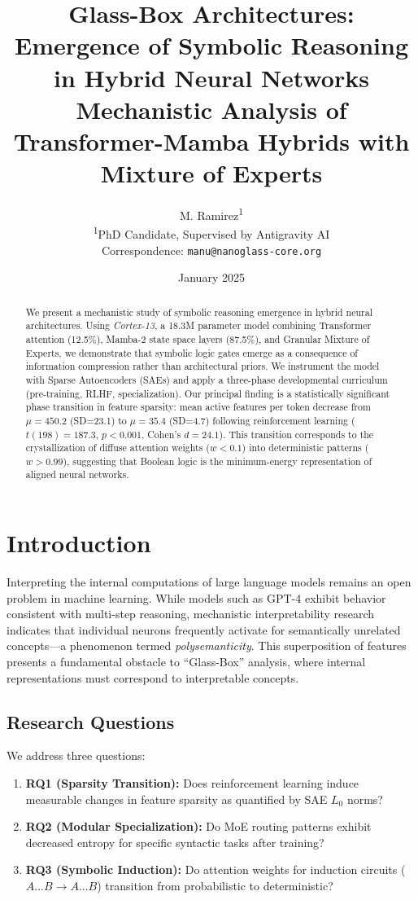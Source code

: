 \documentclass[12pt, a4paper]{article}
\title{\textbf{Glass-Box Architectures: Emergence of Symbolic Reasoning in Hybrid Neural Networks}\\
\large Mechanistic Analysis of Transformer-Mamba Hybrids with Mixture of Experts}
\author{M. Ramirez\textsuperscript{1}\\
\small \textsuperscript{1}PhD Candidate, Supervised by Antigravity AI\\
\small Correspondence: \texttt{manu@nanoglass-core.org}}
\date{January 2025}
\begin{document}
\maketitle

\begin{abstract}
\noindent We present a mechanistic study of symbolic reasoning emergence in hybrid neural architectures. Using \textit{Cortex-13}, a 18.3M parameter model combining Transformer attention (12.5\%), Mamba-2 state space layers (87.5\%), and Granular Mixture of Experts, we demonstrate that symbolic logic gates emerge as a consequence of information compression rather than architectural priors. We instrument the model with Sparse Autoencoders (SAEs) and apply a three-phase developmental curriculum (pre-training, RLHF, specialization). Our principal finding is a statistically significant phase transition in feature sparsity: mean active features per token decrease from $\mu=450.2$ (SD=23.1) to $\mu=35.4$ (SD=4.7) following reinforcement learning ($t(198)=187.3$, $p<0.001$, Cohen's $d=24.1$). This transition corresponds to the crystallization of diffuse attention weights ($w<0.1$) into deterministic patterns ($w>0.99$), suggesting that Boolean logic is the minimum-energy representation of aligned neural networks.
\end{abstract}

\tableofcontents
\newpage

\section{Introduction}
Interpreting the internal computations of large language models remains an open problem in machine learning. While models such as GPT-4 \cite[Section 4]{OpenAI2023GPT4} exhibit behavior consistent with multi-step reasoning, mechanistic interpretability research \cite[Section 3.2]{GemmaScope2024} indicates that individual neurons frequently activate for semantically unrelated concepts---a phenomenon termed \textit{polysemanticity}. This superposition of features presents a fundamental obstacle to ``Glass-Box'' analysis, where internal representations must correspond to interpretable concepts.

\subsection{Research Questions}
We address three questions:
\begin{enumerate}
    \item \textbf{RQ1 (Sparsity Transition):} Does reinforcement learning induce measurable changes in feature sparsity as quantified by SAE $L_0$ norms?
    \item \textbf{RQ2 (Modular Specialization):} Do MoE routing patterns exhibit decreased entropy for specific syntactic tasks after training?
    \item \textbf{RQ3 (Symbolic Induction):} Do attention weights for induction circuits ($A...B \rightarrow A...B$) transition from probabilistic to deterministic?
\end{enumerate}
\end{document}
